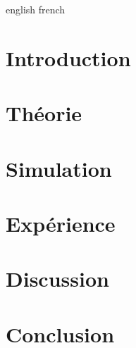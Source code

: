 \documentclass[a4paper,12pt,oneside]{article}
\begin{document}
\def\en{english}
\def\fr{french}
\ifx\en\langparam
	\def\Theory{Theory}
	\def\Experiment{Experiment}
\fi
\ifx\fr\langparam
	\def\Theory{Théorie}
	\def\Experiment{Expérience}
\fi




\section{Introduction}


\section{\Theory}


\section{Simulation}


\section{\Experiment}


\section{Discussion}


\section{Conclusion}


\medskip
 


\end{document}
